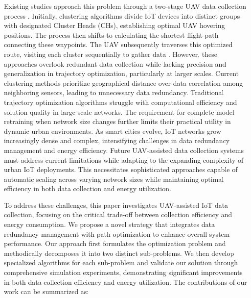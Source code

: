 \documentclass[sigconf]{acmart}
\begin{document}
Existing studies approach this problem through a two-stage UAV data collection process \cite{9-towStage,10-twoStage,11-twoStage}. Initially, clustering algorithms divide IoT devices into distinct groups with designated Cluster Heads (CHs), establishing optimal UAV hovering positions. The process then shifts to calculating the shortest flight path connecting these waypoints. The UAV subsequently traverses this optimized route, visiting each cluster sequentially to gather data \cite{12-eachCluster-sequence}. However, these approaches overlook redundant data collection while lacking precision and generalization in trajectory optimization, particularly at larger scales. Current clustering methods prioritize geographical distance over data correlation among neighboring sensors, leading to unnecessary data redundancy. Traditional trajectory optimization algorithms struggle with computational efficiency and solution quality in large-scale networks. The requirement for complete model retraining when network size changes further limits their practical utility in dynamic urban environments. As smart cities evolve, IoT networks grow increasingly dense and complex, intensifying challenges in data redundancy management and energy efficiency. Future UAV-assisted data collection systems must address current limitations while adapting to the expanding complexity of urban IoT deployments. This necessitates sophisticated approaches capable of automatic scaling across varying network sizes while maintaining optimal efficiency in both data collection and energy utilization.




To address these challenges, this paper investigates UAV-assisted IoT data collection, focusing on the critical trade-off between collection efficiency and energy consumption. We propose a novel strategy that integrates data redundancy management with path optimization to enhance overall system performance. Our approach first formulates the optimization problem and methodically decomposes it into two distinct sub-problems. We then develop specialized algorithms for each sub-problem and validate our solution through comprehensive simulation experiments, demonstrating significant improvements in both data collection efficiency and energy utilization. The contributions of our work can be summarized as:
\end{document}
